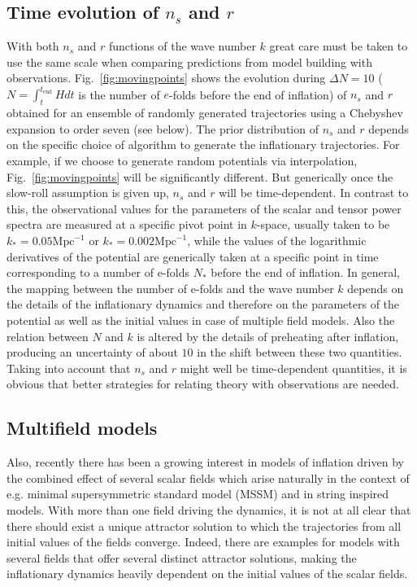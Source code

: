 \documentclass[a4paper,11pt]{article}
\begin{document}
\subsection{Time evolution of $n_s$ and $r$}
With both $n_s$ and $r$ functions of the wave number $k$ great care
must be taken to use the same scale when comparing predictions from
model building with observations. Fig.~\ref{fig:movingpoints} shows
the evolution during $\Delta N=10$ ($N=\int^{t_{\mathrm{end}}}_{t} H
dt$ is the number of $e$-folds before the end of inflation) of $n_s$
and $r$ obtained for an ensemble of randomly generated trajectories
using a Chebyshev expansion to order seven (see below). The prior
distribution of $n_s$ and $r$ depends on the specific choice of
algorithm to generate the inflationary trajectories.  For example, if
we choose to generate random potentials via interpolation,
Fig.~\ref{fig:movingpoints} will be significantly different.  But
generically once the slow-roll assumption is given up, $n_s$ and $r$
will be time-dependent. In contrast to this, the observational values
for the parameters of the scalar and tensor power spectra are measured
at a specific pivot point in $k$-space, usually taken to be
$k_*=0.05\mathrm{Mpc}^{-1}$ or $k_*=0.002\mathrm{Mpc}^{-1}$, while the
values of the logarithmic derivatives of the potential are generically
taken at a specific point in time corresponding to a number of e-folds
$N_*$ before the end of inflation. In general, the mapping between the
number of e-folds and the wave number $k$ depends on the details of
the inflationary dynamics and therefore on the parameters of the
potential as well as the initial values in case of multiple field
models. Also the relation between $N$ and $k$ is altered by the
details of preheating after inflation, producing an uncertainty of
about $10$ in the shift between these two quantities. Taking into
account that $n_s$ and $r$ might well be time-dependent quantities, it
is obvious that better strategies for relating theory with
observations are needed.

\subsection{Multifield models}
Also, recently there has been a growing interest in models of
inflation driven by the combined effect of several scalar fields which
arise naturally in the context of e.g. minimal supersymmetric standard
model (MSSM) and in string inspired models. With more than one field
driving the dynamics, it is not at all clear that there should exist a
unique attractor solution to which the trajectories from all initial
values of the fields converge. Indeed, there are examples for models
with several fields that offer several distinct attractor
solutions\cite{Bond:2006nc}, making the inflationary dynamics heavily
dependent on the initial values of the scalar fields.
\end{document}
